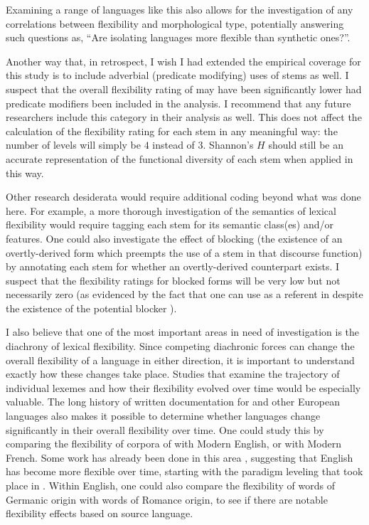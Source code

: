 Examining a range of languages like this also allows for the investigation of any correlations between flexibility and morphological type, potentially answering such questions as, \enquote{Are isolating languages more flexible than synthetic ones?}. 

Another way that, in retrospect, I wish I had extended the empirical coverage for this study is to include adverbial (predicate modifying) uses of stems as well. I suspect that the overall flexibility rating of  may have been significantly lower had predicate modifiers been included in the analysis. I recommend that any future researchers include this category in their analysis as well. This does not affect the calculation of the flexibility rating for each stem in any meaningful way: the number of levels will simply be $4$ instead of $3$. Shannon's $H$ should still be an accurate representation of the functional diversity of each stem when applied in this way.

Other research desiderata would require additional coding beyond what was done here. For example, a more thorough investigation of the semantics of lexical flexibility would require tagging each stem for its semantic class(es) and/or features. One could also investigate the effect of blocking (the existence of an overtly-derived form which preempts the use of a stem in that discourse function) by annotating each stem for whether an overtly-derived counterpart exists. I suspect that the flexibility ratings for blocked forms will be very low but not necessarily zero (as evidenced by the fact that one can use  as a referent in  despite the existence of the potential blocker ).

I also believe that one of the most important areas in need of investigation is the diachrony of lexical flexibility. Since competing diachronic forces can change the overall flexibility of a language in either direction, it is important to understand exactly how these changes take place. Studies that examine the trajectory of individual lexemes and how their flexibility evolved over time would be especially valuable. The long history of written documentation for  and other European languages also makes it possible to determine whether languages change significantly in their overall flexibility over time. One could study this by comparing the flexibility of corpora of  with Modern English, or  with Modern French. Some work has already been done in this area \parencites[414]{Cannon1985}{Kastovsky1996}, suggesting that English has become more flexible over time, starting with the paradigm leveling that took place in . Within English, one could also compare the flexibility of words of Germanic origin with words of Romance origin, to see if there are notable flexibility effects based on source language.

